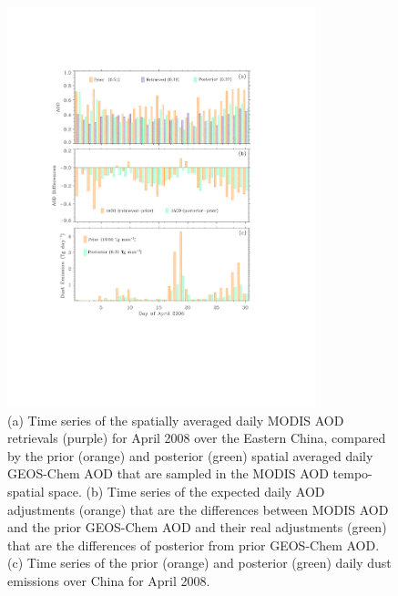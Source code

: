  \begin{figure}[p]
  \centering
  \includegraphics[width={0.8\textwidth}]{figures/a4.pdf}
  \caption{(a) Time series of the spatially averaged daily MODIS AOD retrievals (purple) for April 2008 over the Eastern China, compared by the prior (orange) and posterior (green) spatial averaged daily GEOS-Chem AOD that are sampled in the MODIS AOD tempo-spatial space. (b) Time series of the expected daily AOD adjustments (orange) that are the differences between MODIS AOD and the prior GEOS-Chem AOD and their real adjustments (green) that are the differences of posterior from prior GEOS-Chem AOD. (c) Time series of the prior (orange) and posterior (green) daily dust emissions over China for April 2008.}
  \label{fig:dailyaod}
 \end{figure}

